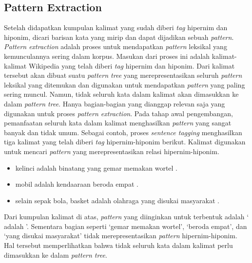\subsection{Pattern Extraction}
Setelah didapatkan kumpulan kalimat yang sudah diberi \textit{tag} hipernim dan hiponim, dicari barisan kata yang mirip dan dapat dijadikan sebuah \textit{pattern}. \textit{Pattern extraction} adalah proses untuk mendapatkan \textit{pattern} leksikal yang kemunculannya sering dalam korpus. Masukan dari proses ini adalah kalimat-kalimat Wikipedia yang telah diberi \textit{tag} hipernim dan hiponim. Dari kalimat tersebut akan dibuat suatu \textit{pattern tree} yang merepresentasikan seluruh \textit{pattern} leksikal yang ditemukan dan digunakan untuk mendapatkan \textit{pattern} yang paling sering muncul. Namun, tidak seluruh kata dalam kalimat akan dimasukkan ke dalam \textit{pattern tree}. Hanya bagian-bagian yang dianggap relevan saja yang digunakan untuk proses \textit{pattern extraction}. Pada tahap awal pengembangan, pemanfaatan seluruh kata dalam kalimat menghasilkan \textit{pattern} yang sangat banyak dan tidak umum. Sebagai contoh, proses \textit{sentence tagging} menghasilkan tiga kalimat yang telah diberi \textit{tag} hipernim-hiponim berikut. Kalimat digunakan untuk mencari \textit{pattern} yang merepresentasikan relasi hipernim-hiponim.
\begin{itemize}
  \item {\tagStart} {\tagHyponym}kelinci{\tagHyponymEnd} adalah {\tagHypernym}binatang{\tagHypernymEnd} yang gemar memakan wortel . {\tagEnd}
  \item {\tagStart} {\tagHyponym}mobil{\tagHyponymEnd} adalah {\tagHypernym}kendaaraan{\tagHypernymEnd} beroda empat . {\tagEnd}
  \item {\tagStart} selain sepak bola, {\tagHyponym}basket{\tagHyponymEnd} adalah {\tagHypernym}olahraga{\tagHypernymEnd} yang disukai masyarakat . {\tagEnd}
\end{itemize}
Dari kumpulan kalimat di atas, \textit{pattern} yang diinginkan untuk terbentuk adalah `{\tagHyponym} adalah {\tagHypernym}'. Sementara bagian seperti `gemar memakan wortel', `beroda empat', dan `yang disukai masyarakat' tidak merepresentasikan \textit{pattern} hipernim-hiponim. Hal tersebut memperlihatkan bahwa tidak seluruh kata dalam kalimat perlu dimasukkan ke dalam \textit{pattern tree}.

